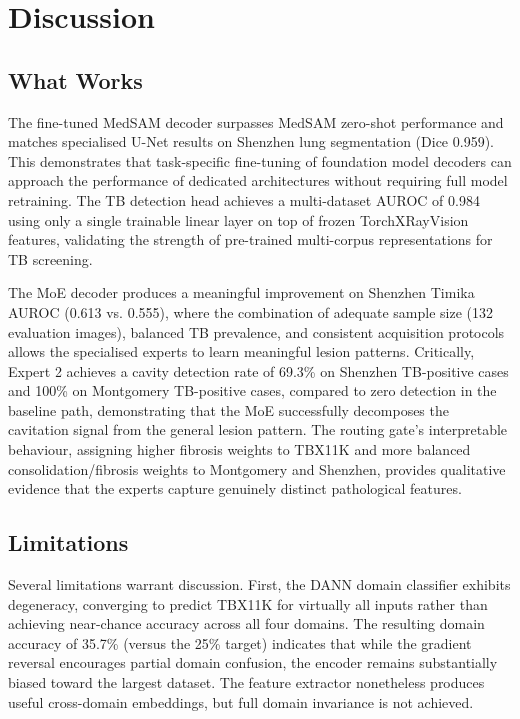\documentclass{article}
\begin{document}
\section{Discussion}

\subsection{What Works}

The fine-tuned MedSAM decoder surpasses MedSAM zero-shot performance and matches specialised U-Net results on Shenzhen lung segmentation (Dice 0.959). This demonstrates that task-specific fine-tuning of foundation model decoders can approach the performance of dedicated architectures without requiring full model retraining. The TB detection head achieves a multi-dataset AUROC of 0.984 using only a single trainable linear layer on top of frozen TorchXRayVision features, validating the strength of pre-trained multi-corpus representations for TB screening.

The MoE decoder produces a meaningful improvement on Shenzhen Timika AUROC (0.613 vs. 0.555), where the combination of adequate sample size (132 evaluation images), balanced TB prevalence, and consistent acquisition protocols allows the specialised experts to learn meaningful lesion patterns. Critically, Expert 2 achieves a cavity detection rate of 69.3\% on Shenzhen TB-positive cases and 100\% on Montgomery TB-positive cases, compared to zero detection in the baseline path, demonstrating that the MoE successfully decomposes the cavitation signal from the general lesion pattern. The routing gate's interpretable behaviour, assigning higher fibrosis weights to TBX11K and more balanced consolidation/fibrosis weights to Montgomery and Shenzhen, provides qualitative evidence that the experts capture genuinely distinct pathological features.

\subsection{Limitations}

Several limitations warrant discussion. First, the DANN domain classifier exhibits degeneracy, converging to predict TBX11K for virtually all inputs rather than achieving near-chance accuracy across all four domains. The resulting domain accuracy of 35.7\% (versus the 25\% target) indicates that while the gradient reversal encourages partial domain confusion, the encoder remains substantially biased toward the largest dataset. The feature extractor nonetheless produces useful cross-domain embeddings, but full domain invariance is not achieved.
\end{document}
